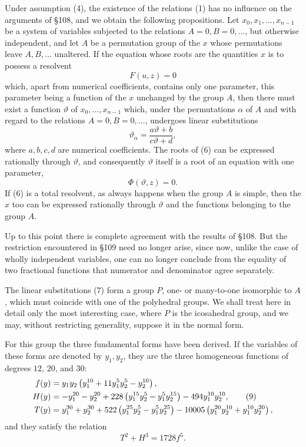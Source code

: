 \documentclass[11pt]{article}
\begin{document}
Under assumption (4), the existence of the relations (1) has no influence on the arguments of §108, and we obtain the following propositions. Let \(x_0,x_1,\ldots,x_{n-1}\) be a system of variables subjected to the relations \(A=0,B=0,\ldots\), but otherwise independent, and let \(A\) be a permutation group of the \(x\) whose permutations leave \(A,B,\ldots\) unaltered. If the equation whose roots are the quantities \(x\) is to possess a resolvent
\begin{equation}
F(u,z)=0
\tag{6}
\end{equation}
which, apart from numerical coefficients, contains only one parameter, this parameter being a function of the \(x\) unchanged by the group \(A\), then there must exist a function \(\vartheta\) of \(x_0,\ldots,x_{n-1}\) which, under the permutations \(\alpha\) of \(A\) and with regard to the relations \(A=0,B=0,\ldots\), undergoes linear substitutions
\begin{equation}
\vartheta_\alpha=\frac{a\vartheta+b}{c\vartheta+d},
\tag{7}
\end{equation}
where \(a,b,c,d\) are numerical coefficients. The roots of (6) can be expressed rationally through \(\vartheta\), and consequently \(\vartheta\) itself is a root of an equation with one parameter,
\begin{equation}
\Phi(\vartheta,z)=0.
\tag{8}
\end{equation}
If (6) is a total resolvent, as always happens when the group \(A\) is simple, then the \(x\) too can be expressed rationally through \(\vartheta\) and the functions belonging to the group \(A\).

Up to this point there is complete agreement with the results of §108. But the restriction encountered in §109 need no longer arise, since now, unlike the case of wholly independent variables, one can no longer conclude from the equality of two fractional functions that numerator and denominator agree separately.

The linear substitutions (7) form a group \(P\), one- or many-to-one isomorphic to \(A\), which must coincide with one of the polyhedral groups. We shall treat here in detail only the most interesting case, where \(P\) is the icosahedral group, and we may, without restricting generality, suppose it in the normal form.

For this group the three fundamental forms have been derived. If the variables of these forms are denoted by \(y_1,y_2\), they are the three homogeneous functions of degrees \(12\), \(20\), and \(30\):
\begin{align}
f(y)&=y_1y_2\left(y_1^{10}+11y_1^5y_2^5-y_2^{10}\right),\notag\\
H(y)&=-y_1^{20}-y_2^{20}+228\left(y_1^{15}y_2^5-y_1^5y_2^{15}\right)-494y_1^{10}y_2^{10},\tag{9}\\
T(y)&=y_1^{30}+y_2^{30}+522\left(y_1^{25}y_2^5-y_1^5y_2^{25}\right)
-10005\left(y_1^{20}y_2^{10}+y_1^{10}y_2^{20}\right),\notag
\end{align}
and they satisfy the relation
\begin{equation}
T^2+H^3=1728 f^5.
\tag{10}
\end{equation}
\end{document}
